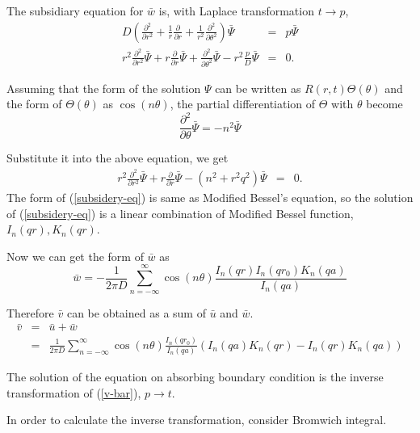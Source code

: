 \documentclass{article}
\begin{document}
The subsidiary equation for $\bar{w}$ is, with Laplace transformation $t \rightarrow p$,
\begin{eqnarray}
    D\left( \frac{\partial^2}{\partial r^2} + \frac{1}{r}\frac{\partial}{\partial r} + \frac{1}{r^2}\frac{\partial^2}{\partial \theta^2} \right) \bar{\Psi} &=& p\bar{\Psi} \nonumber \\
    r^2\frac{\partial^2}{\partial r^2}\bar{\Psi} + r\frac{\partial}{\partial r}\bar{\Psi} + \frac{\partial^2}{\partial \theta^2}\bar{\Psi} - r^2\frac{p}{D}\bar{\Psi} &=& 0.
\end{eqnarray}

Assuming that the form of the solution $\Psi$ can be written as
 $R(r, t)\Theta(\theta)$ and the form of $\Theta(\theta)$ as $\cos(n\theta)$,
 the partial differentiation of $\Theta$ with $\theta$ become
\begin{equation}
    \frac{\partial^2}{\partial\theta}\bar{\Psi} = -n^2\bar{\Psi}
\end{equation}

Substitute it into the above equation, we get
\begin{eqnarray} \label{subsidery-eq}
    r^2\frac{\partial^2}{\partial r^2}\bar{\Psi} + r\frac{\partial}{\partial r}\bar{\Psi} -(n^2 + r^2q^2)\bar{\Psi} &=& 0.
\end{eqnarray}
The form of (\ref{subsidery-eq}) is same as Modified Bessel's equation, so the solution of (\ref{subsidery-eq}) is a linear combination of Modified Bessel function, $I_n(qr), K_n(qr)$.

Now we can get the form of $\bar{w}$ as 
\begin{equation}
    \bar{w} = - \frac{1}{2\pi D}\sum^{\infty}_{n=-\infty}\cos(n\theta)\frac{I_n(qr)I_n(qr_0)K_n(qa)}{I_n(qa)}
\end{equation}

Therefore $\bar{v}$ can be obtained as a sum of $\bar{u}$ and ${\bar{w}}$.
\begin{eqnarray}
    \bar{v} &=& \bar{u} + \bar{w} \nonumber \\
            &=& \frac{1}{2\pi D}\sum_{n=-\infty}^{\infty}\cos(n\theta)
                \frac{I_n(qr_0)}{I_n(qa)}(I_n(qa)K_n(qr) - I_n(qr)K_n(qa)) \label{v-bar}
\end{eqnarray}

The solution of the equation on absorbing boundary condition is the inverse transformation of (\ref{v-bar}), $p\rightarrow t$.

In order to calculate the inverse transformation, consider Bromwich integral.
\end{document}
